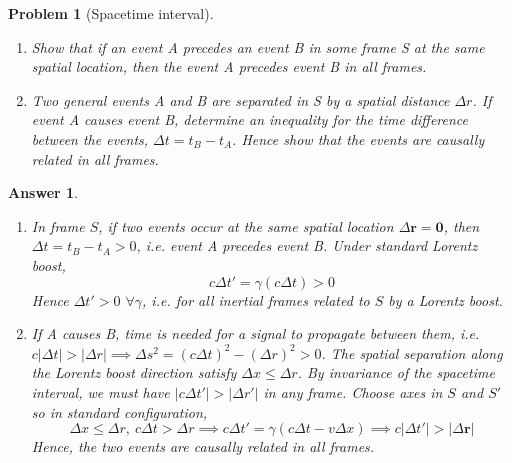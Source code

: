 \documentclass[a4paper]{article}
\theoremstyle{new2}
\newtheorem{ans}{Answer}[section]
\theoremstyle{new}
\newtheorem{qns}{Problem}[section]
\begin{document}
\begin{qns}[Spacetime interval]\leavevmode
\begin{enumerate}[label=(\alph*)]
\item Show that if an event A precedes an event B in some frame S at the same spatial location, then the event A precedes event B in all frames. 
\item Two general events A and B are separated in S by a spatial distance $\Delta r$. If event A causes event B, determine an inequality for the time difference between the events, $\Delta t=t_B-t_A$. Hence show that the events are causally related in all frames.
\end{enumerate}
\end{qns}
\begin{ans}\leavevmode
\begin{enumerate}[label=(\alph*)]
\item In frame $S$, if two events occur at the same spatial location $\Delta\mathbf{r}=\boldsymbol{0}$, then $\Delta t=t_B-t_A>0$, i.e. event A precedes event B. Under standard Lorentz boost,
$$c\Delta t'=\gamma(c\Delta t)>0$$
Hence $\Delta t'>0$ $\forall\gamma$, i.e. for all inertial frames related to $S$ by a Lorentz boost.
\item If A causes B, time is needed for a signal to propagate between them, i.e. $c|\Delta t|>|\Delta r|\implies\Delta s^2=(c\Delta t)^2-(\Delta r)^2>0$. The spatial separation along the Lorentz boost direction satisfy $\Delta x\leq\Delta r$. By invariance of the spacetime interval, we must have $|c\Delta t'|>|\Delta r'|$ in any frame. Choose axes in $S$ and $S'$ so in standard configuration,
$$\Delta x\leq\Delta r,~c\Delta t>\Delta r\implies c\Delta t'=\gamma(c\Delta t-v\Delta x)\implies c|\Delta t'|>|\Delta\mathbf{r}|$$
Hence, the two events are causally related in all frames.
\end{enumerate}
\end{ans}
\newpage
\end{document}
